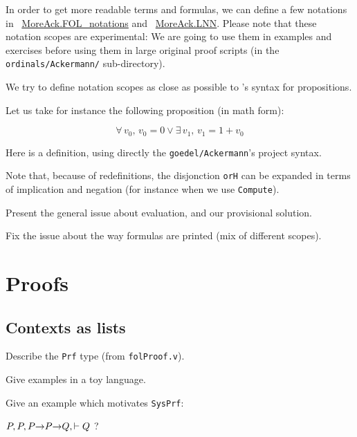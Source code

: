 In order to get more readable terms and formulas, we can define a few notations in ~\href{../theories/html/hydras.MoreAck.FOL_notations.html}{MoreAck.FOL\_notations} and
~\href{../theories/html/hydras.MoreAck.LNN.html}{MoreAck.LNN}.
Please note that these notation scopes are experimental: We are going to use them in examples and exercises before using them in large original proof scripts (in the \texttt{ordinals/Ackermann/} sub-directory).

We try to define notation scopes as close as possible to \coq's syntax for propositions.

Let us take for instance the following proposition (in math form):

$$\forall\, v_0,\, v_0=0\vee \exists\,v_1,\,v_1=1+v_0$$

Here is a definition, using directly the \texttt{goedel/Ackermann}'s project syntax.


Note that, because of redefinitions, the disjonction \texttt{orH}
can be expanded in terms of  implication and negation (for instance when we use \texttt{Compute}).

\begin{todo}
  Present the general issue about evaluation, and our provisional solution.
\end{todo}


\begin{todo}
Fix the issue about the way formulas are printed (mix of different scopes).
\end{todo}







\section{Proofs}

\subsection{Contexts as lists}
\begin{todo}
Describe the \texttt{Prf} type (from \texttt{folProof.v}).

Give examples in a toy language.

Give an example which motivates \texttt{SysPrf}:

$P,P , P\mbox{$\rightarrow$} P \mbox{$\rightarrow$} Q, \vdash Q$ ?
\end{todo}

